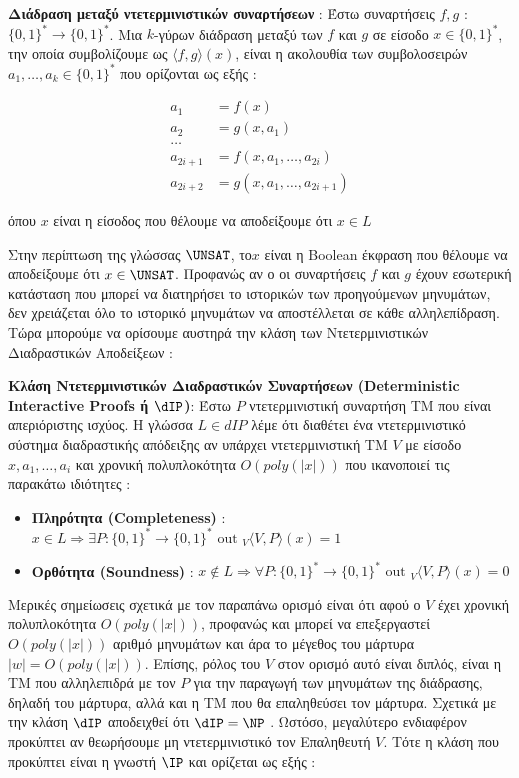 \begin{definition}
\textbf{Διάδραση μεταξύ ντετερμινιστικών συναρτήσεων} : Έστω συναρτήσεις $f, g$ : $\{0,1\}^{*} \rightarrow\{0,1\}^{*}$. Μια $k$-γύρων διάδραση μεταξύ των $f$ και $g$ σε είσοδο $x \in\{0,1\}^{*}$, την οποία συμβολίζουμε ως $\langle f, g\rangle(x)$, είναι η ακολουθία των συμβολοσειρών $a_{1}, \ldots, a_{k} \in\{0,1\}^{*}$ που ορίζονται ως εξής :

$$
\begin{aligned}
a_{1} &=f(x) \\
a_{2} &=g(x, a_{1}) \\
\ldots & \\
a_{2 i+1} &=f(x, a_{1}, \ldots, a_{2 i}) \\
a_{2 i+2} &=g(x, a_{1}, \ldots, a_{2 i+1})
\end{aligned}
$$

όπου $x$ είναι η είσοδος που θέλουμε να αποδείξουμε ότι $x \in L$
\end{definition}

Στην περίπτωση της γλώσσας $\UNSAT$, το$x$ είναι η Boolean έκφραση που θέλουμε να αποδείξουμε ότι $x \in \UNSAT$. Προφανώς αν ο οι συναρτήσεις $f$ και $g$ έχουν εσωτερική κατάσταση που μπορεί να διατηρήσει το ιστορικών των προηγούμενων μηνυμάτων, δεν χρειάζεται όλο το ιστορικό μηνυμάτων να αποστέλλεται σε κάθε αλληλεπίδραση. Τώρα μπορούμε να ορίσουμε αυστηρά την κλάση των Ντετερμινιστικών Διαδραστικών Αποδείξεων :

\begin{definition}
\textbf{Κλάση Ντετερμινιστικών Διαδραστικών Συναρτήσεων (Deterministic Interactive Proofs ή $\dIP$)}: Έστω $P$ ντετερμινιστική συναρτήση ΤΜ που είναι απεριόριστης ισχύος. Η γλώσσα $L \in dIP$ λέμε ότι διαθέτει ένα ντετερμινιστικό σύστημα διαδραστικής απόδειξης αν υπάρχει ντετερμινιστική TM $V$ με είσοδο $x, a_{1}, \ldots, a_{i}$ και χρονική πολυπλοκότητα $O(poly(|x|))$ που ικανοποιεί τις παρακάτω ιδιότητες : 
\begin{itemize}
    \item \textbf{Πληρότητα (Completeness)} : $x \in L \Rightarrow \exists P:\{0,1\}^{*} \rightarrow\{0,1\}^{*} \text { out }_{V}\langle V, P\rangle(x) = 1$
    \item \textbf{Ορθότητα (Soundness)} : $x \notin L \Rightarrow \forall P:\{0,1\}^{*} \rightarrow\{0,1\}^{*} \text { out }_{V}\langle V, P\rangle(x) = 0$
\end{itemize}
\end{definition}

Μερικές σημείωσεις σχετικά με τον παραπάνω ορισμό είναι ότι αφού ο $V$ έχει χρονική πολυπλοκότητα $O(poly(|x|))$, προφανώς και μπορεί να επεξεργαστεί $O(poly(|x|))$ αριθμό μηνυμάτων και άρα το μέγεθος του μάρτυρα $|w|=O(poly(|x|))$. Επίσης, ρόλος του $V$ στον ορισμό αυτό είναι διπλός, είναι η ΤΜ που αλληλεπιδρά με τον $P$ για την παραγωγή των μηνυμάτων της διάδρασης, δηλαδή του μάρτυρα, αλλά και η ΤΜ που θα επαληθεύσει τον μάρτυρα. Σχετικά με την κλάση  $\dIP$ αποδειχθεί ότι $\dIP = \NP$ . Ωστόσο, μεγαλύτερο ενδιαφέρον προκύπτει αν θεωρήσουμε μη ντετερμινιστικό τον Επαληθευτή $V$. Τότε η κλάση που προκύπτει είναι η γνωστή $\IP$ και ορίζεται ως εξής :

